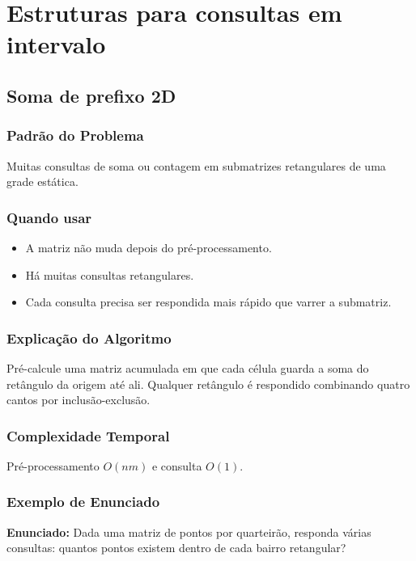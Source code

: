 \chapter{Estruturas para consultas em intervalo}

\section{Soma de prefixo 2D}

\subsection{Padrão do Problema}
Muitas consultas de soma ou contagem em submatrizes retangulares de uma grade estática.

\subsection{Quando usar}
\begin{itemize}[nosep]
  \item A matriz não muda depois do pré-processamento.
  \item Há muitas consultas retangulares.
  \item Cada consulta precisa ser respondida mais rápido que varrer a submatriz.
\end{itemize}

\subsection{Explicação do Algoritmo}
Pré-calcule uma matriz acumulada em que cada célula guarda a soma do retângulo da origem até ali. Qualquer retângulo é respondido combinando quatro cantos por inclusão-exclusão.

\subsection{Complexidade Temporal}
Pré-processamento $O(nm)$ e consulta $O(1)$.

\subsection{Exemplo de Enunciado}
\begin{exemplodiabox}
\textbf{Enunciado:} Dada uma matriz de pontos por quarteirão, responda várias consultas: quantos pontos existem dentro de cada bairro retangular?
\end{exemplodiabox}

